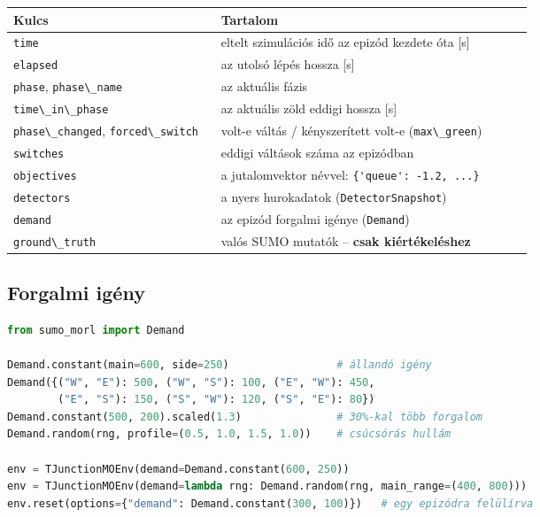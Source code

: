 \begin{longtable}[]{@{}>{\raggedright\arraybackslash}p{0.38\linewidth}>{\raggedright\arraybackslash}p{0.58\linewidth}@{}}
\toprule\noalign{}
Kulcs & Tartalom \\
\midrule\noalign{}
\endhead
\bottomrule\noalign{}
\endlastfoot
\passthrough{\lstinline!time!} & eltelt
szimulációs idő az epizód kezdete óta
{[}s{]} \\
\passthrough{\lstinline!elapsed!} & az
utolsó lépés hossza {[}s{]} \\
\passthrough{\lstinline!phase!},
\passthrough{\lstinline!phase\_name!} &
az aktuális fázis \\
\passthrough{\lstinline!time\_in\_phase!}
& az aktuális zöld eddigi hossza
{[}s{]} \\
\passthrough{\lstinline!phase\_changed!},
\passthrough{\lstinline!forced\_switch!}
& volt-e váltás / kényszerített volt-e
(\passthrough{\lstinline!max\_green!}) \\
\passthrough{\lstinline!switches!} &
eddigi váltások száma az epizódban \\
\passthrough{\lstinline!objectives!} & a
jutalomvektor névvel:
\passthrough{\lstinline!\{'queue': -1.2, ...\}!} \\
\passthrough{\lstinline!detectors!} & a
nyers hurokadatok
(\passthrough{\lstinline!DetectorSnapshot!}) \\
\passthrough{\lstinline!demand!} & az
epizód forgalmi igénye
(\passthrough{\lstinline!Demand!}) \\
\passthrough{\lstinline!ground\_truth!}
& valós SUMO mutatók -- \textbf{csak
kiértékeléshez} \\
\end{longtable}

\hypertarget{forgalmi-iguxe9ny}{%
\subsection{Forgalmi
igény}\label{forgalmi-iguxe9ny}}

\begin{lstlisting}[language=Python]
from sumo_morl import Demand

Demand.constant(main=600, side=250)                 # állandó igény
Demand({("W", "E"): 500, ("W", "S"): 100, ("E", "W"): 450,
        ("E", "S"): 150, ("S", "W"): 120, ("S", "E"): 80})
Demand.constant(500, 200).scaled(1.3)               # 30%-kal több forgalom
Demand.random(rng, profile=(0.5, 1.0, 1.5, 1.0))    # csúcsórás hullám

env = TJunctionMOEnv(demand=Demand.constant(600, 250))
env = TJunctionMOEnv(demand=lambda rng: Demand.random(rng, main_range=(400, 800)))
env.reset(options={"demand": Demand.constant(300, 100)})   # egy epizódra felülírva
\end{lstlisting}

